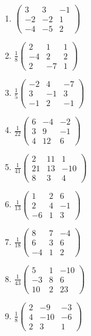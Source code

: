 \begin{enumerate}[label=\arabic*., leftmargin=*, itemsep=1pt]
\item $\left(\begin{smallmatrix}3 & 3 & -1\\ -2 & -2 & 1\\ -4 & -5 & 2\end{smallmatrix}\right)$
\item $\frac{1}{8}\left(\begin{smallmatrix}2 & 1 & 1\\ -4 & 2 & 2\\ 2 & -7 & 1\end{smallmatrix}\right)$
\item $\frac{1}{5}\left(\begin{smallmatrix}-2 & 4 & -7\\ 3 & -1 & 3\\ -1 & 2 & -1\end{smallmatrix}\right)$
\item $\frac{1}{22}\left(\begin{smallmatrix}6 & -4 & -2\\ 3 & 9 & -1\\ 4 & 12 & 6\end{smallmatrix}\right)$
\item $\frac{1}{41}\left(\begin{smallmatrix}2 & 11 & 1\\ 21 & 13 & -10\\ 8 & 3 & 4\end{smallmatrix}\right)$
\item $\frac{1}{13}\left(\begin{smallmatrix}1 & 2 & 6\\ 2 & 4 & -1\\ -6 & 1 & 3\end{smallmatrix}\right)$
\item $\frac{1}{18}\left(\begin{smallmatrix}8 & 7 & -4\\ 6 & 3 & 6\\ -4 & 1 & 2\end{smallmatrix}\right)$
\item $\frac{1}{43}\left(\begin{smallmatrix}5 & 1 & -10\\ -3 & 8 & 6\\ 10 & 2 & 23\end{smallmatrix}\right)$
\item $\frac{1}{8}\left(\begin{smallmatrix}2 & -9 & -3\\ 4 & -10 & -6\\ 2 & 3 & 1\end{smallmatrix}\right)$

\end{enumerate}
